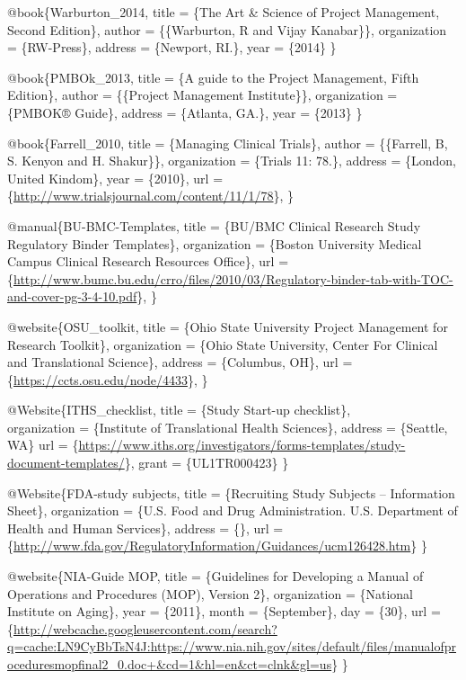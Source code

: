 \documentclass[]{book}
\theoremstyle{definition}
\theoremstyle{definition}
\theoremstyle{definition}
\theoremstyle{remark}
\begin{document}
@book\{Warburton\_2014, title = \{The Art \& Science of Project
Management, Second Edition\}, author = \{\{Warburton, R and Vijay
Kanabar\}\}, organization = \{RW-Press\}, address = \{Newport, RI.\},
year = \{2014\} \}

@book\{PMBOk\_2013, title = \{A guide to the Project Management, Fifth
Edition\}, author = \{\{Project Management Institute\}\}, organization =
\{PMBOK® Guide\}, address = \{Atlanta, GA.\}, year = \{2013\} \}

@book\{Farrell\_2010, title = \{Managing Clinical Trials\}, author =
\{\{Farrell, B, S. Kenyon and H. Shakur\}\}, organization = \{Trials 11:
78.\}, address = \{London, United Kindom\}, year = \{2010\}, url =
\{\url{http://www.trialsjournal.com/content/11/1/78}\}, \}

@manual\{BU-BMC-Templates, title = \{BU/BMC Clinical Research Study
Regulatory Binder Templates\}, organization = \{Boston University
Medical Campus Clinical Research Resources Office\}, url =
\{\url{http://www.bumc.bu.edu/crro/files/2010/03/Regulatory-binder-tab-with-TOC-and-cover-pg-3-4-10.pdf}\},
\}

@website\{OSU\_toolkit, title = \{Ohio State University Project
Management for Research Toolkit\}, organization = \{Ohio State
University, Center For Clinical and Translational Science\}, address =
\{Columbus, OH\}, url = \{\url{https://ccts.osu.edu/node/4433}\}, \}

@Website\{ITHS\_checklist, title = \{Study Start-up checklist\},\\
organization = \{Institute of Translational Health Sciences\}, address =
\{Seattle, WA\} url =
\{\url{https://www.iths.org/investigators/forms-templates/study-document-templates/}\},
grant = \{UL1TR000423\} \}

@Website\{FDA-study subjects, title = \{Recruiting Study Subjects --
Information Sheet\}, organization = \{U.S. Food and Drug Administration.
U.S. Department of Health and Human Services\}, address = \{\}, url =
\{\url{http://www.fda.gov/RegulatoryInformation/Guidances/ucm126428.htm}\}
\}

@website\{NIA-Guide MOP, title = \{Guidelines for Developing a Manual of
Operations and Procedures (MOP), Version 2\}, organization = \{National
Institute on Aging\}, year = \{2011\}, month = \{September\}, day =
\{30\}, url =
\{\url{http://webcache.googleusercontent.com/search?q=cache:LN9CyBbTsN4J:https://www.nia.nih.gov/sites/default/files/manualofproceduresmopfinal2_0.doc+\&cd=1\&hl=en\&ct=clnk\&gl=us}\}
\}
\end{document}
